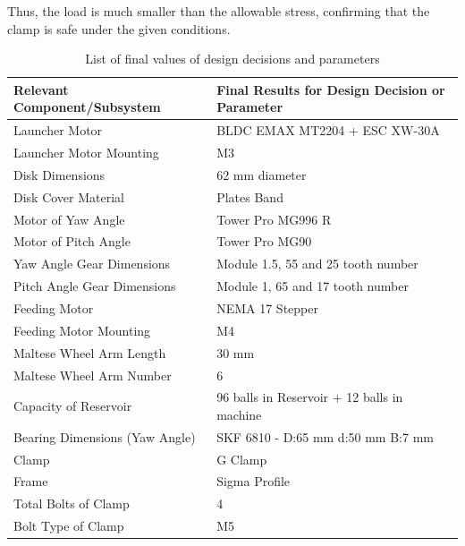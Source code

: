 \documentclass[12pt]{article}
\begin{document}
Thus, the load is much smaller than the allowable stress, confirming that the clamp is safe under the given conditions.

\begin{table}[h!]
\centering
\caption{List of final values of design decisions and parameters}
\scriptsize
\begin{tabular}{|l|l|}
\hline
\textbf{Relevant Component/Subsystem}       & \textbf{Final Results for Design Decision or Parameter} \\ \hline
Launcher Motor                              & BLDC EMAX MT2204 + ESC XW-30A                           \\ \hline
Launcher Motor Mounting                     & M3                                                     \\ \hline
Disk Dimensions                             & 62 mm diameter                                         \\ \hline
Disk Cover Material                         & Plates Band                                            \\ \hline
Motor of Yaw Angle                          & Tower Pro MG996 R                                      \\ \hline
Motor of Pitch Angle                        & Tower Pro MG90                                         \\ \hline
Yaw Angle Gear Dimensions                   & Module 1.5, 55 and 25 tooth number                     \\ \hline
Pitch Angle Gear Dimensions                 & Module 1, 65 and 17 tooth number                       \\ \hline
Feeding Motor                               & NEMA 17 Stepper                                       \\ \hline
Feeding Motor Mounting                      & M4                                                     \\ \hline
Maltese Wheel Arm Length                    & 30 mm                                                  \\ \hline
Maltese Wheel Arm Number                    & 6                                                      \\ \hline
Capacity of Reservoir                       & 96 balls in Reservoir + 12 balls in machine            \\ \hline
Bearing Dimensions (Yaw Angle)             & SKF 6810 - D:65 mm d:50 mm B:7 mm                      \\ \hline
Clamp                                       & G Clamp                                                \\ \hline
Frame                                       & Sigma Profile                                          \\ \hline
Total Bolts of Clamp                        & 4                                                      \\ \hline
Bolt Type of Clamp                          & M5                                                     \\ \hline
\end{tabular}
\end{table}
\end{document}
